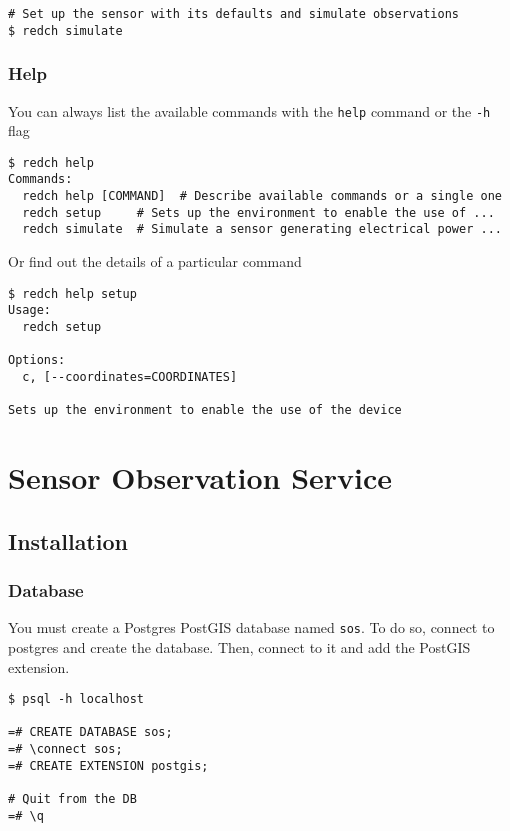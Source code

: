 \begin{verbatim}
# Set up the sensor with its defaults and simulate observations
$ redch simulate
\end{verbatim}

\subsubsection*{Help}\label{help}

You can always list the available commands with the \texttt{help}
command or the \texttt{-h} flag

\begin{verbatim}
$ redch help
Commands:
  redch help [COMMAND]  # Describe available commands or a single one
  redch setup     # Sets up the environment to enable the use of ...
  redch simulate  # Simulate a sensor generating electrical power ...
\end{verbatim}

Or find out the details of a particular command

\begin{verbatim}
$ redch help setup
Usage:
  redch setup

Options:
  c, [--coordinates=COORDINATES]

Sets up the environment to enable the use of the device
\end{verbatim}


\section{Sensor Observation Service}\label{doc-sos}

\subsection*{Installation}\label{installation}

\subsubsection*{Database}\label{database}

You must create a Postgres PostGIS database named \texttt{sos}. To do
so, connect to postgres and create the database. Then, connect to it and
add the PostGIS extension.

\begin{verbatim}
$ psql -h localhost

=# CREATE DATABASE sos;
=# \connect sos;
=# CREATE EXTENSION postgis;

# Quit from the DB
=# \q
\end{verbatim}

